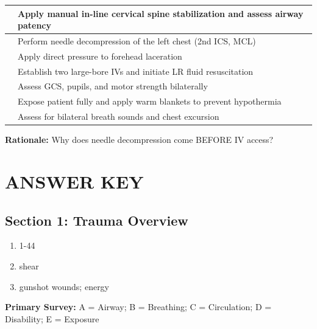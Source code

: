 \documentclass[11pt]{article}
\begin{document}
\begin{tabular}{|p{0.5cm}|p{12cm}|}
\hline
\underline{\hspace{0.5cm}} & Apply manual in-line cervical spine stabilization and assess airway patency \\
\hline
\underline{\hspace{0.5cm}} & Perform needle decompression of the left chest (2nd ICS, MCL) \\
\hline
\underline{\hspace{0.5cm}} & Apply direct pressure to forehead laceration \\
\hline
\underline{\hspace{0.5cm}} & Establish two large-bore IVs and initiate LR fluid resuscitation \\
\hline
\underline{\hspace{0.5cm}} & Assess GCS, pupils, and motor strength bilaterally \\
\hline
\underline{\hspace{0.5cm}} & Expose patient fully and apply warm blankets to prevent hypothermia \\
\hline
\underline{\hspace{0.5cm}} & Assess for bilateral breath sounds and chest excursion \\
\hline
\end{tabular}

\vspace{0.5cm}
\textbf{Rationale:} Why does needle decompression come BEFORE IV access?

\underline{\hspace{12cm}}

\underline{\hspace{12cm}}

\newpage
\section*{ANSWER KEY}

\subsection*{Section 1: Trauma Overview}
\begin{enumerate}
    \item 1-44
    \item shear
    \item gunshot wounds; energy
\end{enumerate}

\textbf{Primary Survey:}
A = Airway; B = Breathing; C = Circulation; D = Disability; E = Exposure
\end{document}
